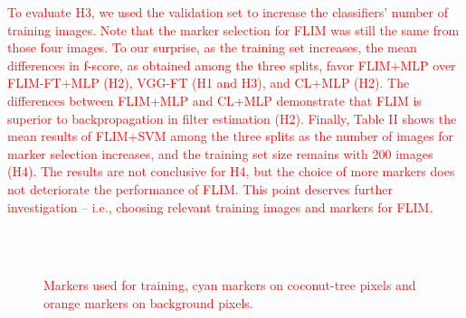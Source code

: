 \documentclass[journal, twoside]{IEEEtran}
\begin{document}
\textcolor{red}{To evaluate H3, we used the validation set to increase the classifiers' number of training images. Note that the marker selection for FLIM was still the same from those four images. To our surprise, as the training set increases, the mean differences in f-score, as obtained among the three splits, favor FLIM+MLP over FLIM-FT+MLP (H2), VGG-FT (H1 and H3), and CL+MLP (H2). The differences between FLIM+MLP and CL+MLP demonstrate that FLIM is superior to backpropagation in filter estimation (H2). Finally, Table II shows the mean results of FLIM+SVM among the three splits as the number of images for marker selection increases, and the training set size remains with 200 images (H4). The results are not conclusive for H4, but the choice of more markers does not deteriorate the performance of FLIM. This point deserves further investigation -- i.e., choosing relevant training images and markers for FLIM. }  


\begin{figure}[!t]
    \centering
    ~
    \\
    ~
    \caption{\textcolor{red}{Markers used for training, cyan markers on coconut-tree pixels and orange markers on background pixels.}}
    \label{fig:markers}
\end{figure}
\end{document}
